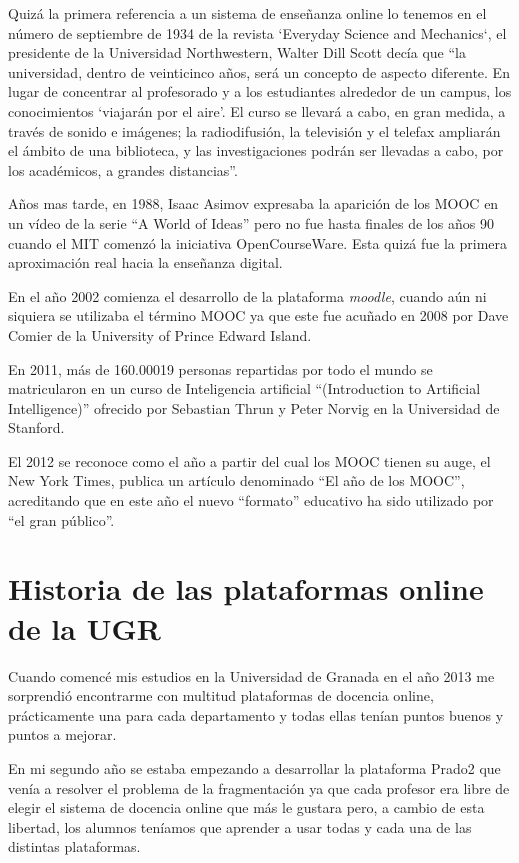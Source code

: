 Quizá la primera referencia a un sistema de enseñanza online lo tenemos en el número de septiembre de 1934 de la revista ‘Everyday Science and Mechanics‘, el presidente de la Universidad Northwestern, Walter Dill Scott decía que ``la universidad, dentro de veinticinco años, será un concepto de aspecto diferente. En lugar de concentrar al profesorado y a los estudiantes alrededor de un campus, los conocimientos ‘viajarán por el aire’. El curso se llevará a cabo, en gran medida, a través de sonido e imágenes; la radiodifusión, la televisión y el telefax ampliarán el ámbito de una biblioteca, y las investigaciones podrán ser llevadas a cabo, por los académicos, a grandes distancias''\cite{art_12}.

\bigskip
Años mas tarde, en 1988, Isaac Asimov expresaba la aparición de los MOOC en un vídeo de la serie ``A World of Ideas'' pero no fue hasta finales de los años 90 cuando el MIT comenzó la iniciativa OpenCourseWare. Esta quizá fue la primera aproximación real hacia la enseñanza digital.

\bigskip
En el año 2002 comienza el desarrollo de la plataforma \textit{moodle}, cuando aún ni siquiera se utilizaba el término MOOC ya que este fue acuñado en 2008 por Dave Comier de la University of Prince Edward Island.

\bigskip
En 2011, más de 160.00019 personas repartidas por todo el mundo se matricularon en un curso de Inteligencia artificial ``(Introduction to Artificial Intelligence)'' ofrecido por Sebastian Thrun y Peter Norvig en la Universidad de Stanford.

\bigskip
El 2012 se reconoce como el año a partir del cual los MOOC tienen su auge, el New York Times, publica un artículo denominado ``El año de los MOOC'', acreditando que en este año el nuevo ``formato'' educativo ha sido utilizado por ``el gran público''.

\section{Historia de las plataformas online de la UGR}

Cuando comencé mis estudios en la Universidad de Granada en el año 2013 me sorprendió encontrarme con multitud plataformas de docencia online, prácticamente una para cada departamento y todas ellas tenían puntos buenos y puntos a mejorar.

\bigskip
En mi segundo año se estaba empezando a desarrollar la plataforma Prado2 que venía a resolver el problema de la fragmentación ya que cada profesor era libre de elegir el sistema de docencia online que más le gustara pero, a cambio de esta libertad, los alumnos teníamos que aprender a usar todas y cada una de las distintas plataformas.

